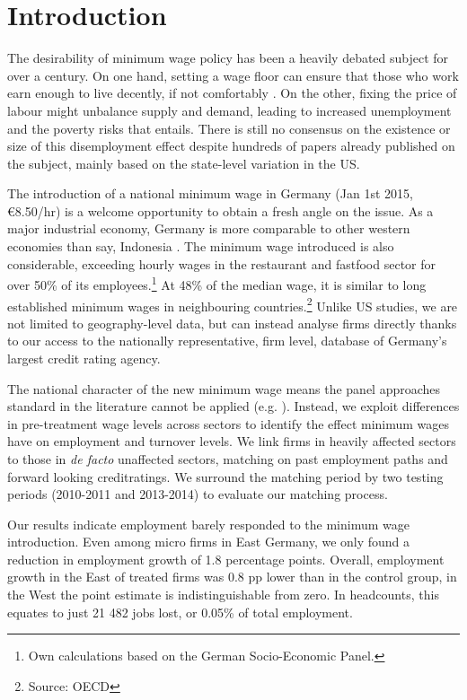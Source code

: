 \section{Introduction} \label{chap:introduction}
The desirability of minimum wage policy has been a heavily debated subject for over a century. On one hand, setting a wage floor can ensure that those who work earn enough to live decently, if not comfortably \citep{Macrosty1898}. On the other, fixing the price of labour might unbalance supply and demand, leading to increased unemployment and the poverty risks that entails. There is still no consensus on the existence or size of this disemployment effect despite hundreds of papers already published on the subject, mainly based on the state-level variation in the US.

The introduction of a national minimum wage in Germany (Jan 1st 2015, €8.50/hr) is a welcome opportunity to obtain a fresh angle on the issue. As a major industrial economy, Germany is more comparable to other western economies than say, Indonesia \citep{Pratomo2016}. The minimum wage introduced is also considerable, exceeding hourly wages in the restaurant and fastfood sector for over 50\% of its employees.\footnote{Own calculations based on the German Socio-Economic Panel.} At 48\% of the median wage, it is similar to long established minimum wages in neighbouring countries.\footnote{Source: OECD} Unlike US studies, we are not limited to geography-level data, but can instead analyse firms directly thanks to our access to the nationally representative, firm level, database of Germany's largest credit rating agency.

The national character of the new minimum wage means the panel approaches standard in the literature cannot be applied (e.g. \citet{Neumark1992, Allegretto2013, Dube2010}). Instead, we exploit differences in pre-treatment wage levels across sectors to identify the effect minimum wages have on employment and turnover levels. We link firms in heavily affected sectors to those in \emph{de facto} unaffected sectors, matching on past employment paths and forward looking creditratings. We surround the matching period by two testing periods (2010-2011 and 2013-2014) to evaluate our matching process.

Our results indicate employment barely responded to the minimum wage introduction. Even among micro firms in East Germany, we only found a reduction in employment growth of 1.8 percentage points. Overall, employment growth in the East of treated firms was 0.8 pp lower than in the control group, in the West the point estimate is indistinguishable from zero. In headcounts, this equates to just 21 482 jobs lost, or 0.05\% of total employment.

